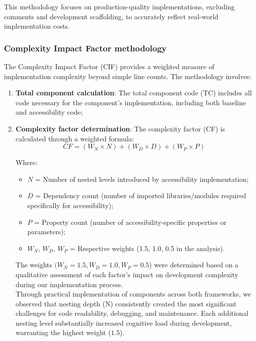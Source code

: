 This methodology focuses on production-quality implementations, excluding comments and development scaffolding, to accurately reflect real-world implementation costs.

\subsubsection{Complexity Impact Factor methodology}
\label{subsubsec:cif-methodology}

The Complexity Impact Factor (CIF) provides a weighted measure of implementation complexity beyond simple line counts. The methodology involves:

\begin{enumerate}
    \item \textbf{Total component calculation}: The total component code (TC) includes all code necessary for the component's implementation, including both baseline and accessibility code;
    
    \item \textbf{Complexity factor determination}: The complexity factor (CF) is calculated through a weighted formula:
    \begin{equation}
    CF = (W_N \times N) + (W_D \times D) + (W_P \times P)
    \end{equation}
    
    Where:
    \begin{itemize}
        \item $N$ = Number of nested levels introduced by accessibility implementation;
        \item $D$ = Dependency count (number of imported libraries/modules required specifically for accessibility);
        \item $P$ = Property count (number of accessibility-specific properties or parameters);
        \item $W_N$, $W_D$, $W_P$ = Respective weights (1.5, 1.0, 0.5 in the analysis).
    \end{itemize}

    The weights $(W_N=1.5, W_D=1.0, W_P=0.5$) were determined based on a qualitative assessment of each factor's impact on development complexity during our implementation process. \\

    Through practical implementation of components across both frameworks, we observed that nesting depth (N) consistently created the most significant challenges for code readability, debugging, and maintenance. Each additional nesting level substantially increased cognitive load during development, warranting the highest weight ($1.5$). 


\end{enumerate}
